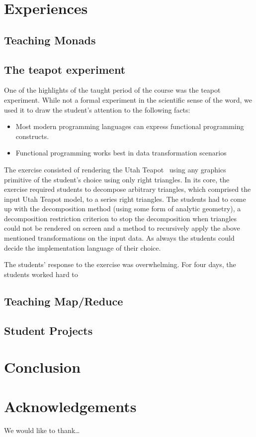 \documentclass[conference]{IEEEtran}
\begin{document}
\section{Experiences}

\subsection{Teaching Monads}

\subsection{The teapot experiment}

One of the highlights of the taught period of the course was the teapot
experiment. While not a formal experiment in the scientific sense of the word,
we used it to draw the student's attention to the following facts:

\begin{itemize}

  \item Most modern programming languages can express functional programming
    constructs.

  \item Functional programming works best in data transformation scenarios

\end{itemize}

The exercise consisted of rendering the Utah Teapot~\cite{Torre06} using any
graphics primitive of the student's choice using only right triangles.  In its
core, the exercise required students to decompose arbitrary triangles, which
comprised the input Utah Teapot model, to a series right triangles.  The
students had to come up with the decomposition method (using some form of
analytic geometry), a decomposition restriction criterion to stop the
decomposition when triangles could not be rendered on screen and a method to
recursively apply the above mentioned transformations on the input data. As
always the students could decide the implementation language of their choice.

The students' response to the exercise was overwhelming. For four days,
the students worked hard to 

\subsection{Teaching Map/Reduce}

\subsection{Student Projects}

\section{Conclusion}

\section*{Acknowledgements}

We would like to thank\ldots



\end{document}
